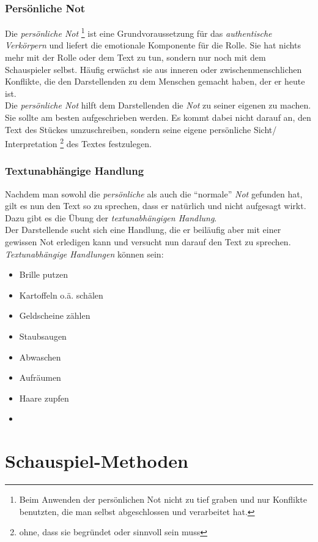 \documentclass[ngerman, a4paper, twoside]{scrbook}%
\begin{document}
	\section{Persönliche Not}
	Die \emph{persönliche Not}
	\footnote{Beim Anwenden der persönlichen Not nicht zu tief graben und nur Konflikte benutzten, die man selbst abgeschlossen und verarbeitet hat.}
	ist eine Grundvoraussetzung für das \emph{authentische Verkörpern} und liefert die emotionale Komponente für die Rolle.  Sie hat nichts mehr mit der Rolle oder dem Text zu tun, sondern nur noch mit dem Schauspieler selbst. Häufig erwächst sie aus inneren oder zwischenmenschlichen Konflikte, die  den Darstellenden zu dem Menschen gemacht haben, der er heute ist. \\
	Die \emph{persönliche Not} hilft dem Darstellenden die \emph{Not} zu seiner eigenen zu machen. Sie sollte am besten aufgeschrieben werden. Es kommt dabei nicht darauf an, den Text des Stückes umzuschreiben, sondern seine eigene persönliche Sicht/ Interpretation
	\footnote{ohne, dass sie begründet oder sinnvoll sein muss}
	 des Textes festzulegen.
	 \vfill
	 \section{Textunabhängige Handlung}
	 Nachdem man sowohl die \emph{persönliche} als auch die "`normale"' \emph{Not} gefunden hat, gilt es nun den Text so zu sprechen, dass er natürlich und nicht aufgesagt wirkt. 	 Dazu gibt es die Übung der \emph{textunabhängigen Handlung}.\\
	 Der Darstellende sucht sich eine Handlung, die er beiläufig aber mit einer gewissen Not erledigen kann und versucht nun darauf den Text zu sprechen.\\
	 \emph{Textunabhängige Handlungen} können sein:
	 \begin{itemize}
	 	\item Brille putzen
	 	\item Kartoffeln o.ä. schälen
	 	\item Geldscheine zählen
	 	\item Staubsaugen
	 	\item Abwaschen
	 	\item Aufräumen
	 	\item Haare zupfen
	 	\item
	 \end{itemize}



	\setcounter{chapter}{0}
	\setcounter{section}{0}
	\part{Schauspiel-Methoden}
\end{document}
